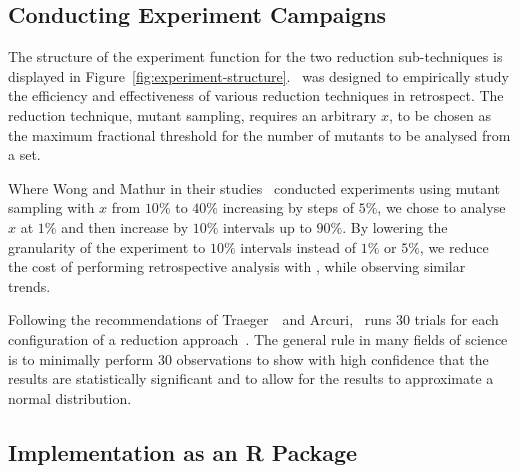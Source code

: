 \subsection{Conducting Experiment Campaigns}




The structure of the experiment function for the two reduction sub-techniques is displayed in
Figure~\ref{fig:experiment-structure}. \mr~was designed to empirically study the efficiency and effectiveness of various
reduction techniques in retrospect. The reduction technique, mutant sampling, requires an arbitrary $x$, to be chosen as
the maximum fractional threshold for the number of mutants to be analysed from a set.

Where Wong and Mathur in their studies~\cite{mathur1994empirical, wong1993mutation} conducted experiments using mutant
sampling with $x$ from $10\%$ to $40\%$ increasing by steps of $5\%$, we chose to analyse $x$ at $1\%$ and then increase
by $10\%$ intervals up to $90\%$. By lowering the granularity of the experiment to $10\%$ intervals instead of $1\%$ or
$5\%$, we reduce the cost of performing retrospective analysis with \mr, while observing similar trends.

Following the recommendations of Traeger~\etal~and Arcuri, \mr~runs 30 trials for each configuration of a reduction
approach~\cite{traeger2008nine, arcuri2014hitchhiker}. The general rule in many fields of science is to minimally
perform 30 observations to show with high confidence that the results are statistically significant and to allow for the
results to approximate a normal distribution.

\subsection{Implementation as an R Package}

